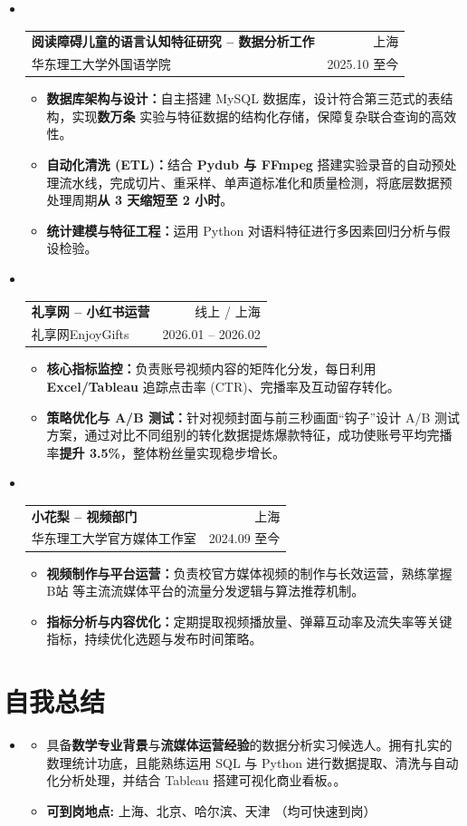 \documentclass[a4paper, 12pt]{article}
\makeatletter
\newcommand{\cvitem}[1]{
  \item{
    {#1\vspace{-2pt}}
  }
}
\newcommand{\cvheading}[4]{
  \vspace{-7pt}\item\
    \begin{tabular*}{\textwidth}[t]{l@{\extracolsep{\fill}}r}
      \textbf{#1} & #2 \\
      \small #3 & \small#4 \\
    \end{tabular*}\vspace{-6pt}
}
\newcommand{\cvheadingstart}{\begin{itemize}[leftmargin=0in, label={}]}
\newcommand{\cvheadingend}{\end{itemize}}
\newcommand{\cvitemstart}{\begin{itemize}\justifying}
\newcommand{\cvitemend}{\end{itemize}\vspace{-12pt}}
\makeatother
\begin{document}
\cvheadingstart
  \cvheading
    {阅读障碍儿童的语言认知特征研究 -- 数据分析工作}{上海}
    {华东理工大学外国语学院}{2025.10 至今}
    \cvitemstart
      \cvitem{\textbf{数据库架构与设计：}自主搭建 MySQL 数据库，设计符合第三范式的表结构，实现\textbf{数万条} 实验与特征数据的结构化存储，保障复杂联合查询的高效性。}
      \cvitem{\textbf{自动化清洗 (ETL)：}结合 \textbf{Pydub 与 FFmpeg} 搭建实验录音的自动预处理流水线，完成切片、重采样、单声道标准化和质量检测，将底层数据预处理周期\textbf{从 3 天缩短至 2 小时}。}
      \cvitem{\textbf{统计建模与特征工程：}运用 Python 对语料特征进行多因素回归分析与假设检验。}
    \cvitemend

  \cvheading
    {礼享网 -- 小红书运营}{线上 / 上海}
    {礼享网EnjoyGifts}{2026.01 -- 2026.02}
    \cvitemstart
      \cvitem{\textbf{核心指标监控：}负责账号视频内容的矩阵化分发，每日利用 \textbf{Excel/Tableau} 追踪点击率 (CTR)、完播率及互动留存转化。}
      \cvitem{\textbf{策略优化与 A/B 测试：}针对视频封面与前三秒画面“钩子”设计 A/B 测试方案，通过对比不同组别的转化数据提炼爆款特征，成功使账号平均完播率\textbf{提升 3.5\%}，整体粉丝量实现稳步增长。}
    \cvitemend

  \cvheading
    {小花梨 -- 视频部门}{上海}
    {华东理工大学官方媒体工作室}{2024.09 至今}
    \cvitemstart
      \cvitem{\textbf{视频制作与平台运营：}负责校官方媒体视频的制作与长效运营，熟练掌握 B站 等主流流媒体平台的流量分发逻辑与算法推荐机制。}
      \cvitem{\textbf{指标分析与内容优化：}定期提取视频播放量、弹幕互动率及流失率等关键指标，持续优化选题与发布时间策略。}
    \cvitemend
\cvheadingend
\vspace{0pt}



\section{自我总结}
\cvheadingstart
\item
  \cvitemstart
    \cvitem{具备\textbf{数学专业背景}与\textbf{流媒体运营经验}的数据分析实习候选人。拥有扎实的数理统计功底，且能熟练运用 SQL 与 Python 进行数据提取、清洗与自动化分析处理，并结合 Tableau 搭建可视化商业看板。。}
    \cvitem{\textbf{可到岗地点: }上海、北京、哈尔滨、天津 （均可快速到岗）}
  \cvitemend
\cvheadingend
\end{document}
